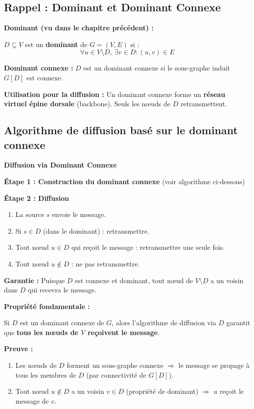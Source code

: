 \documentclass[12pt,a4paper]{article}
\begin{document}
\subsection{Rappel : Dominant et Dominant Connexe}

\begin{definition}
\textbf{Dominant (vu dans le chapitre précédent) :}

$D \subseteq V$ est un \textbf{dominant} de $G = (V, E)$ si :
$$\forall u \in V \setminus D,\ \exists v \in D : (u, v) \in E$$

\textbf{Dominant connexe :} $D$ est un dominant connexe si le sous-graphe induit $G[D]$
est connexe.

\textbf{Utilisation pour la diffusion :} Un dominant connexe forme un \textbf{réseau virtuel
épine dorsale} (backbone). Seuls les nœuds de $D$ retransmettent.
\end{definition}

\subsection{Algorithme de diffusion basé sur le dominant connexe}

\begin{algorithme}
\textbf{Diffusion via Dominant Connexe}

\textbf{Étape 1 : Construction du dominant connexe} (voir algorithme ci-dessous)

\textbf{Étape 2 : Diffusion}
\begin{enumerate}
    \item La source $s$ envoie le message.
    \item Si $s \in D$ (dans le dominant) : retransmettre.
    \item Tout nœud $u \in D$ qui reçoit le message : retransmettre une seule fois.
    \item Tout nœud $u \notin D$ : ne pas retransmettre.
\end{enumerate}

\textbf{Garantie :} Puisque $D$ est connexe et dominant, tout nœud de $V \setminus D$ a un
voisin dans $D$ qui recevra le message.
\end{algorithme}

\begin{important}
\textbf{Propriété fondamentale :}

Si $D$ est un dominant connexe de $G$, alors l'algorithme de diffusion via $D$ garantit que
\textbf{tous les nœuds de $V$ reçoivent le message}.

\textbf{Preuve :}
\begin{enumerate}
    \item Les nœuds de $D$ forment un sous-graphe connexe $\Rightarrow$ le message se propage à
          tous les membres de $D$ (par connectivité de $G[D]$).
    \item Tout nœud $u \notin D$ a un voisin $v \in D$ (propriété de dominant) $\Rightarrow$
          $u$ reçoit le message de $v$.
\end{enumerate}
\end{important}
\end{document}
